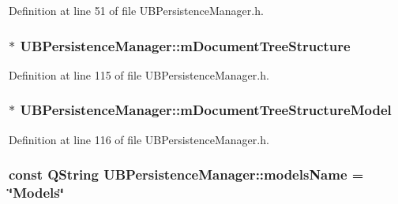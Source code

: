 Definition at line 51 of file U\-B\-Persistence\-Manager.\-h.

\hypertarget{class_u_b_persistence_manager_ac901694c75aea223436f520692703f81}{
\subsubsection[{m\-Document\-Tree\-Structure}]{$\ast$ U\-B\-Persistence\-Manager\-::m\-Document\-Tree\-Structure}}\label{d0/dd5/class_u_b_persistence_manager_ac901694c75aea223436f520692703f81}


Definition at line 115 of file U\-B\-Persistence\-Manager.\-h.

\hypertarget{class_u_b_persistence_manager_a2e25c262cc712d327aeb68f40ba8085f}{
\subsubsection[{m\-Document\-Tree\-Structure\-Model}]{$\ast$ U\-B\-Persistence\-Manager\-::m\-Document\-Tree\-Structure\-Model}}\label{d0/dd5/class_u_b_persistence_manager_a2e25c262cc712d327aeb68f40ba8085f}


Definition at line 116 of file U\-B\-Persistence\-Manager.\-h.

\hypertarget{class_u_b_persistence_manager_a7eaef6e12db76b89277eca477511204e}{
\subsubsection[{models\-Name}]{\setlength{\rightskip}{0pt plus 5cm}const Q\-String U\-B\-Persistence\-Manager\-::models\-Name = \char`\"{}Models\char`\"{}\hspace{0.3cm}{\ttfamily [static]}}}\label{d0/dd5/class_u_b_persistence_manager_a7eaef6e12db76b89277eca477511204e}


